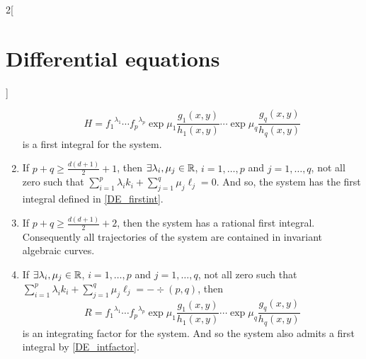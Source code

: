 \documentclass[../../../main.tex]{subfiles}
\begin{document}
\begin{multicols}{2}[\section{Differential equations}]
\begin{theorem}
\begin{enumerate}
            \begin{equation}\label{DE_firstint}
              H={f_1}^{\lambda_1}\cdots{f_p}^{\lambda_p}\exp{\mu_1\frac{g_1(x,y)}{h_1(x,y)}}\cdots\exp{\mu_q\frac{g_q(x,y)}{h_q(x,y)}}
            \end{equation}
            is a first integral for the system.
      \item If $p+q\geq \frac{d(d+1)}{2}+1$, then $\exists \lambda_i,\mu_j\in\mathbb{R}$, $i=1,\ldots,p$ and $j=1,\ldots,q$, not all zero such that $\sum_{i=1}^p\lambda_ik_i+\sum_{j=1}^q\mu_j\ell_j=0$. And so, the system has the first integral defined in \cref{DE_firstint}.
      \item If $p+q\geq \frac{d(d+1)}{2}+2$, then the system has a rational first integral. Consequently all trajectories of the system are contained in
            invariant algebraic curves.
      \item If $\exists \lambda_i,\mu_j\in\mathbb{R}$, $i=1,\ldots,p$ and $j=1,\ldots,q$, not all zero such that $\sum_{i=1}^p\lambda_ik_i+\sum_{j=1}^q\mu_j\ell_j=-\div(p,q)$, then
            \begin{equation*}
              R={f_1}^{\lambda_1}\cdots{f_p}^{\lambda_p}\exp{\mu_1\frac{g_1(x,y)}{h_1(x,y)}}\cdots\exp{\mu_q\frac{g_q(x,y)}{h_q(x,y)}}
            \end{equation*}
            is an integrating factor for the system. And so the system also admits a first integral by \cref{DE_intfactor}.
    \end{enumerate}
  \end{theorem}

\end{multicols}
\end{document}
